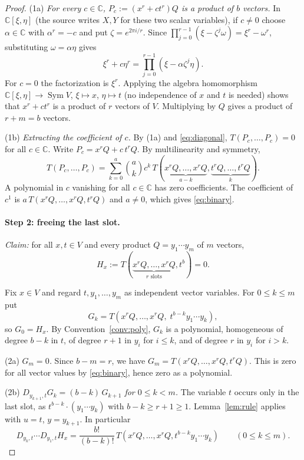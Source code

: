 \documentclass[11pt]{article}
\theoremstyle{definition}
\theoremstyle{remark}
\DeclareMathOperator{\Sym}{Sym}
\newcommand{\C}{\mathbb C}
\newcommand{\D}[2]{D_{#1,#2}}
\begin{document}
\begin{proof}
(1a) \emph{For every $c\in\C$, $P_c:=(x^r+ct^r)Q$ is a product of $b$
vectors.} In $\C[\xi,\eta]$ (the source writes $X,Y$ for these two scalar
variables), if $c\ne0$ choose $\alpha\in\C$ with $\alpha^r=-c$ and put
$\zeta=e^{2\pi i/r}$. Since
$\prod_{j=0}^{r-1}(\xi-\zeta^j\omega)=\xi^r-\omega^r$, substituting
$\omega=\alpha\eta$ gives
\[
 \xi^r+c\eta^r=\prod_{j=0}^{r-1}(\xi-\alpha\zeta^j\eta).
\]
For $c=0$ the factorization is $\xi^r$. Applying the algebra homomorphism
$\C[\xi,\eta]\to\Sym V$, $\xi\mapsto x$, $\eta\mapsto t$ (no independence of
$x$ and $t$ is needed) shows that $x^r+ct^r$ is a product of $r$ vectors of
$V$. Multiplying by $Q$ gives a product of $r+m=b$ vectors.

(1b) \emph{Extracting the coefficient of $c$.} By (1a) and
\eqref{eq:diagonal}, $T(P_c,\ldots,P_c)=0$ for all $c\in\C$. Write
$P_c=x^rQ+c\,t^rQ$. By multilinearity and symmetry,
\[
 T(P_c,\ldots,P_c)=\sum_{k=0}^a\binom akc^k\,
 T(\underbrace{x^rQ,\ldots,x^rQ}_{a-k},\underbrace{t^rQ,\ldots,t^rQ}_{k}).
\]
A polynomial in $c$ vanishing for all $c\in\C$ has zero coefficients. The
coefficient of $c^1$ is $a\,T(x^rQ,\ldots,x^rQ,t^rQ)$ and $a\ne0$, which
gives \eqref{eq:binary}.

\paragraph{Step 2: freeing the last slot.}
\emph{Claim:} for all $x,t\in V$ and every product $Q=y_1\cdots y_m$ of $m$
vectors,
\begin{equation}\label{eq:step2}
 H_x:=T(\underbrace{x^rQ,\ldots,x^rQ}_{r\text{ slots}},t^b)=0.
\end{equation}

Fix $x\in V$ and regard $t,y_1,\ldots,y_m$ as independent vector variables.
For $0\le k\le m$ put
\[
 G_k=T(x^rQ,\ldots,x^rQ,\;t^{b-k}y_1\cdots y_k),
\]
so $G_0=H_x$. By Convention~\ref{conv:poly}, $G_k$ is a polynomial,
homogeneous of degree $b-k$ in $t$, of degree $r+1$ in $y_i$ for $i\le k$,
and of degree $r$ in $y_i$ for $i>k$.

(2a) \emph{$G_m=0$.} Since $b-m=r$, we have
$G_m=T(x^rQ,\ldots,x^rQ,t^rQ)$. This is zero for all vector values by
\eqref{eq:binary}, hence zero as a polynomial.

(2b) \emph{$\D{y_{k+1}}{t}G_k=(b-k)\,G_{k+1}$ for $0\le k<m$.} The variable
$t$ occurs only in the last slot, as $t^{b-k}\cdot(y_1\cdots y_k)$ with
$b-k\ge r+1\ge1$. Lemma~\ref{lem:rule} applies with $u=t$, $y=y_{k+1}$. In
particular
\begin{equation}\label{eq:first-composition}
 \D{y_k}{t}\cdots\D{y_1}{t}H_x
 =\frac{b!}{(b-k)!}\,
 T(x^rQ,\ldots,x^rQ,t^{b-k}y_1\cdots y_k)\qquad(0\le k\le m).
\end{equation}


\end{proof}
\end{document}
